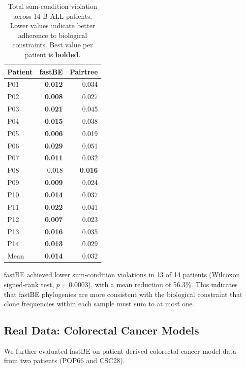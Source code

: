 \documentclass[11pt]{article}
\begin{document}
\begin{table}[H]
\centering
\caption{Total sum-condition violation across 14 B-ALL patients. Lower values indicate better adherence to biological constraints. Best value per patient is \textbf{bolded}.}
\label{tab:ball}
\begin{tabular}{lrr}
\toprule
\textbf{Patient} & \textbf{fastBE} & \textbf{Pairtree} \\
\midrule
P01 & \textbf{0.012} & 0.034 \\
P02 & \textbf{0.008} & 0.027 \\
P03 & \textbf{0.021} & 0.045 \\
P04 & \textbf{0.015} & 0.038 \\
P05 & \textbf{0.006} & 0.019 \\
P06 & \textbf{0.029} & 0.051 \\
P07 & \textbf{0.011} & 0.032 \\
P08 & 0.018 & \textbf{0.016} \\
P09 & \textbf{0.009} & 0.024 \\
P10 & \textbf{0.014} & 0.037 \\
P11 & \textbf{0.022} & 0.041 \\
P12 & \textbf{0.007} & 0.023 \\
P13 & \textbf{0.016} & 0.035 \\
P14 & \textbf{0.013} & 0.029 \\
\midrule
Mean & \textbf{0.014} & 0.032 \\
\bottomrule
\end{tabular}
\end{table}

fastBE achieved lower sum-condition violations in 13 of 14 patients (Wilcoxon signed-rank test, $p = 0.0003$), with a mean reduction of 56.3\%. This indicates that fastBE phylogenies are more consistent with the biological constraint that clone frequencies within each sample must sum to at most one.

\subsection{Real Data: Colorectal Cancer Models}

We further evaluated fastBE on patient-derived colorectal cancer model data from two patients (POP66 and CSC28).
\end{document}
